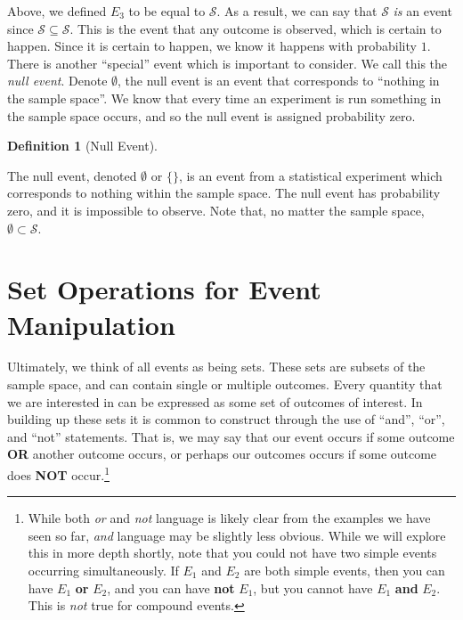 \documentclass[
  letterpaper,
  DIV=11,
  numbers=noendperiod]{scrreprt}
\theoremstyle{definition}
\newtheorem{definition}{Definition}[chapter]
\theoremstyle{definition}
\theoremstyle{definition}
\theoremstyle{remark}
\begin{document}
Above, we defined \(E_3\) to be equal to \(\mathcal{S}\). As a result,
we can say that \(\mathcal{S}\) \emph{is} an event since
\(\mathcal{S} \subseteq \mathcal{S}\). This is the event that any
outcome is observed, which is certain to happen. Since it is certain to
happen, we know it happens with probability \(1\). There is another
``special'' event which is important to consider. We call this the
\emph{null event}. Denote \(\emptyset\), the null event is an event that
corresponds to ``nothing in the sample space''. We know that every time
an experiment is run something in the sample space occurs, and so the
null event is assigned probability zero.

\begin{definition}[Null
Event]\protect\hypertarget{def-null-event}{}\label{def-null-event}

The null event, denoted \(\emptyset\) or \(\{\}\), is an event from a
statistical experiment which corresponds to nothing within the sample
space. The null event has probability zero, and it is impossible to
observe. Note that, no matter the sample space,
\(\emptyset\subset\mathcal{S}\).

\end{definition}

\section{Set Operations for Event
Manipulation}\label{set-operations-for-event-manipulation}

Ultimately, we think of all events as being sets. These sets are subsets
of the sample space, and can contain single or multiple outcomes. Every
quantity that we are interested in can be expressed as some set of
outcomes of interest. In building up these sets it is common to
construct through the use of ``and'', ``or'', and ``not'' statements.
That is, we may say that our event occurs if some outcome \textbf{OR}
another outcome occurs, or perhaps our outcomes occurs if some outcome
does \textbf{NOT} occur.\footnote{While both \emph{or} and \emph{not}
  language is likely clear from the examples we have seen so far,
  \emph{and} language may be slightly less obvious. While we will
  explore this in more depth shortly, note that you could not have two
  simple events occurring simultaneously. If \(E_1\) and \(E_2\) are
  both simple events, then you can have \(E_1\) \textbf{or} \(E_2\), and
  you can have \textbf{not} \(E_1\), but you cannot have \(E_1\)
  \textbf{and} \(E_2\). This is \emph{not} true for compound events.}
\end{document}
